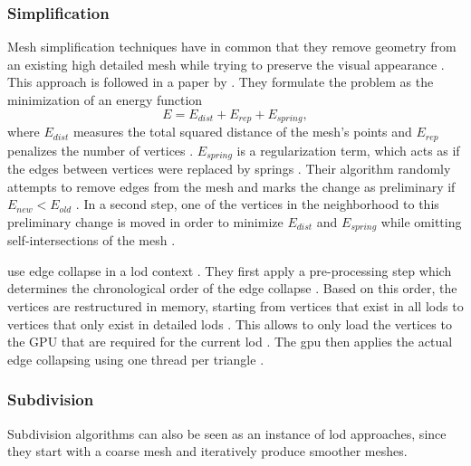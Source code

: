 \subsubsection*{Simplification}
Mesh simplification techniques have in common that they remove geometry from an existing high detailed mesh while trying to preserve the visual appearance \cite{realtime}.
This approach is followed in a paper by \citeauthor{hoppe_simplification} \cite{hoppe_simplification}.
They formulate the problem as the minimization of an energy function 
\begin{equation*}
    E = E_{dist} + E_{rep} + E_{spring},
\end{equation*} where $E_{dist}$ measures the total squared distance of the mesh's points and $E_{rep}$ penalizes the number of vertices \cite{hoppe_simplification}.
$E_{spring}$ is a regularization term, which acts as if the edges between vertices were replaced by springs \cite{hoppe_simplification}.
Their algorithm randomly attempts to remove edges from the mesh and marks the change as preliminary if $E_{new} < E_{old}$ \cite{hoppe_simplification}.
In a second step, one of the vertices in the neighborhood to this preliminary change is moved in order to minimize $E_{dist}$ and $E_{spring}$ while omitting self-intersections of the mesh \cite{hoppe_simplification}.

\citeauthor{peng_simplification} use edge collapse in a \ac{lod} context \cite{peng_simplification}.
They first apply a pre-processing step which determines the chronological order of the edge collapse \cite{peng_simplification}.
Based on this order, the vertices are restructured in memory, starting from vertices that exist in all \acp{lod} to vertices that only exist in detailed \acp{lod} \cite{peng_simplification}.
This allows to only load the vertices to the GPU that are required for the current \ac{lod} \cite{peng_simplification}.
The \ac{gpu} then applies the actual edge collapsing using one thread per triangle \cite{peng_simplification}.

\subsubsection*{Subdivision}
Subdivision algorithms can also be seen as an instance of \ac{lod} approaches, since they start with a coarse mesh and iteratively produce smoother meshes.

